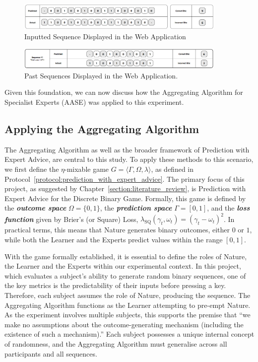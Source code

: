 \begin{figure}[ht]
    \centering
    \includegraphics[width=0.9\textwidth]{images/sequence_input.png}
    \caption{Inputted Sequence Displayed in the Web Application}
\end{figure}

\begin{figure}[ht]
    \centering
    \includegraphics[width=0.9\textwidth]{images/past_sequences.png}
    \caption{Past Sequences Displayed in the Web Application.}
\end{figure}

Given this foundation, we can now discuss how the Aggregating Algorithm for Specialist Experts (AASE) was applied to this experiment.

\subsection{Applying the Aggregating Algorithm}\label{subsection:applying_the_aggregating_algorithm}
The Aggregating Algorithm as well as the broader framework of Prediction with Expert Advice, are central to this study. To apply these methods to this scenario, we first define the $\eta$-mixable game $G = \langle \Gamma, \Omega, \lambda \rangle$, as defined in Protocol~\ref{protocol:prediction_with_expert_advice}. The primary focus of this project, as suggested by Chapter~\ref{section:literature_review}, is Prediction with Expert Advice for the Discrete Binary Game. Formally, this game is defined by the \textbf{\textit{outcome space}} $\Omega = \{0, 1\}$, the \textbf{\textit{prediction space}} $\Gamma = [0, 1]$, and the \textbf{\textit{loss function}} given by Brier's (or Square) Loss, $\lambda_\text{SQ}(\gamma_t, \omega_t) = {(\gamma_t - \omega_t)}^2$.  In practical terms, this means that Nature generates binary outcomes, either $0$ or $1$, while both the Learner and the Experts predict values within the range $[0, 1]$.

With the game formally established, it is essential to define the roles of Nature, the Learner and the Experts within our experimental context. In this project, which evaluates a subject's ability to generate random binary sequences, one of the key metrics is the predictability of their inputs before pressing a key. Therefore, each subject assumes the role of Nature, producing the sequence. The Aggregating Algorithm functions as the Learner attempting to pre-empt Nature. As the experiment involves multiple subjects, this supports the premise that ``we make no assumptions about the outcome-generating mechanism (including the existence of such a mechanism).'' Each subject possesses a unique internal concept of randomness, and the Aggregating Algorithm must generalise across all participants and all sequences.

